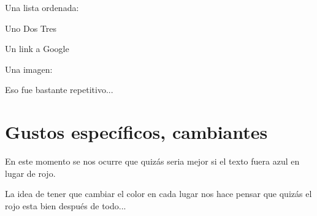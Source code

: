 \documentclass[letterpaper,10pt,spanish]{sphinxmanual}
\begin{document}
\begin{sphinxVerbatim}[commandchars=\\\{\}]
        Una lista ordenada:

           Uno
          Dos
           Tres

        Un link a  Google

        Una imagen:

             
\end{sphinxVerbatim}

Eso fue bastante repetitivo...


\section{Gustos específicos, cambiantes}
\label{\detokenize{css-y-cosas-por-el-estilo:gustos-especificos-cambiantes}}
En este momento se nos ocurre que quizás seria mejor si el texto fuera azul en
lugar de rojo.

La idea de tener que cambiar el color en cada lugar nos hace pensar que quizás
el rojo esta bien después de todo...
\end{document}
